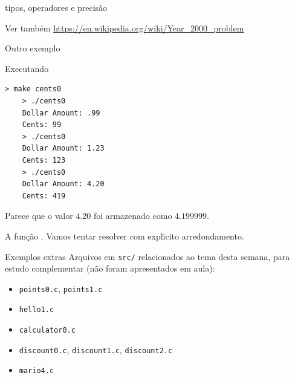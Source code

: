 \documentclass{beamer}
\begin{document}
\begin{frame}{tipos, operadores e precisão}
  \framebreak

  Ver também \url{https://en.wikipedia.org/wiki/Year_2000_problem}

  \framebreak

  Outro exemplo

  

  \framebreak

  Executando

  \begin{lstlisting}[style=code,basicstyle=\ttfamily]
    > make cents0
    > ./cents0
    Dollar Amount: .99
    Cents: 99
    > ./cents0
    Dollar Amount: 1.23
    Cents: 123
    > ./cents0
    Dollar Amount: 4.20
    Cents: 419
  \end{lstlisting}

  Parece que o valor $4.20$ foi armazenado como $4.199999$.

  \framebreak

  A função . Vamos tentar resolver com explicito
  arredondamento.

  
  
\end{frame}

\begin{frame}{Exemplos extras}
  Arquivos em \texttt{src/} relacionados ao tema desta semana, para
  estudo complementar (não foram apresentados em aula):
  \begin{itemize}
    \item \texttt{points0.c}, \texttt{points1.c}
    \item \texttt{hello1.c}
    \item \texttt{calculator0.c}
    \item \texttt{discount0.c}, \texttt{discount1.c}, \texttt{discount2.c}
    \item \texttt{mario4.c}
  \end{itemize}
\end{frame}
\end{document}

